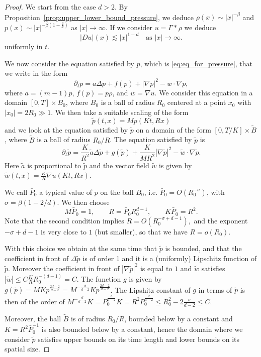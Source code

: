 \documentclass[11pt,a4paper]{article}
\numberwithin{equation}{section}
\theoremstyle{plain}
\theoremstyle{remark}
\begin{document}
\begin{proof}
We start from the case $d>2$. By Proposition~\ref{prop:upper_lower_bound_pressure}, we deduce $\rho(x)\sim |x|^{-\beta}$ and $p(x)\sim |x|^{-\beta\left(1-\frac{2}{d}\right)}$ as $|x|\to \infty$. If we consider $u=\Gamma*\rho$ we deduce 
$$
|Du|(x)\lesssim|x|^{1-d} \quad \text{as $|x|\to \infty$}.
$$
uniformly in $t$.

We now consider the equation satisfied by $p$, which is \eqref{eq:eq_for_pressure}, that we write in the form
$$\partial_t p=a\Delta p+f(p)+|\nabla p|^2-w\cdot \nabla p,$$
where $a=(m-1)p$, $f(p)=p\rho$, and $w=\nabla u$.
We consider this equation in a domain $[0,T]\times B_{0}$, where $B_{0}$ is a ball of radius $R_0$ centered at a point $x_0$ with $|x_0|=2R_0\gg 1 $. We then take a suitable scaling of the form 
$$\tilde p(t,x)=Mp(Kt,Rx)$$
and we look at the equation satisfied by $\tilde p$  on a domain of the form $[0,T/K]\times \tilde B$, where $\tilde B$ is a ball of radius $R_0/R$. The equation satisfied by $\tilde p$ is 
$$\partial_t \tilde p=\frac{K}{R^2}\tilde a\Delta \tilde p+g(\tilde p)+\frac{K}{MR^2}|\nabla \tilde p|^2-\tilde w\cdot \nabla \tilde p.$$
Here $\tilde a$ is proportional to $\tilde p$ and the vector field $\tilde w$ is given by $\tilde w(t,x)=\frac KR\nabla u(Kt,Rx)$.

We call $\bar P_0$ a typical value of $p$ on the ball $B_0$, i.e. $\bar P_0=O(R_0^{-\sigma})$, with $\sigma=\beta(1-2/d)$.  We then choose 
$$M\bar P_0=1, \qquad R=\bar P_0R_0^{d-1},\qquad K\bar P_0=R^2.$$
Note that the second condition implies $R=O(R_0^{-\sigma+d-1}),$ and the exponent $-\sigma+d-1$ is very close to $1$ (but smaller), so that we have $R=o(R_0)$. 

With this choice we obtain at the same time that $\tilde p$ is bounded, and that the coefficient in front of $\Delta\tilde p$ is of order 1 and it is a (uniformly) Lipschitz function of $\tilde p$. Moreover the coefficient in front of $|\nabla \tilde p|^2$ is equal to $1$ and $\tilde w$ satisfies $|\tilde w|\leq C\frac{K}{R}R_0^{-(d-1)}=C$. The function $g$ is given by $g(\tilde p)=MKp^{\frac{2d-2}{d-2}}=M^{-\frac{d}{d-2}}K\tilde p^{\frac{2d-2}{d-2}}$. The Lipshitz constant of $g$ in terms of $\tilde p$ is then of the order of $M^{-\frac{d}{d-2}}K=\bar P_0^{\frac{d}{d-2}}K=R^2\bar P_0^{\frac{2}{d-2}}\leq R_0^2-2\frac{\sigma}{d-2}\leq C$.

Moreover, the ball $\tilde B$ is of radius $R_0/R$, bounded below by a constant and $K=R^2\bar P_0^{-1}$ is also bounded below by a constant, hence the domain where we consider $\tilde p$ satisfies upper bounds on its time length and lower bounds on its spatial size.


\end{proof}
\end{document}
